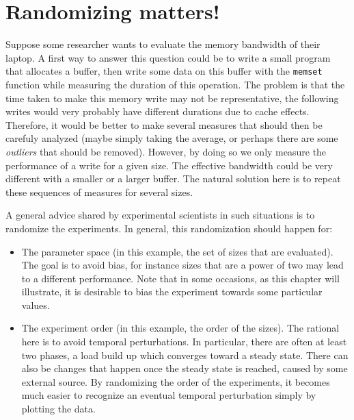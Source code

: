 \chapter{Randomizing matters!}%
\label{chapter:experiment:randomizing}
    Suppose some researcher wants to evaluate the memory bandwidth of their laptop. A first way to answer this question
    could be to write a small program that allocates a buffer, then write some data on this buffer with the
    \texttt{memset} function while measuring the duration of this operation. The problem is that the time taken to make
    this memory write may not be representative, the following writes would very probably have different durations due
    to cache effects.  Therefore, it would be better to make several measures that should then be carefuly analyzed
    (maybe simply taking the average, or perhaps there are some \emph{outliers} that should be removed). However, by
    doing so we only measure the performance of a write for a given size. The effective bandwidth could be very
    different with a smaller or a larger buffer. The natural solution here is to repeat these sequences of measures for
    several sizes.

    A general advice shared by experimental scientists in such situations is to randomize the experiments. In general,
    this randomization should happen for:
    \begin{itemize}
        \item The parameter space (in this example, the set of sizes that are evaluated). The goal is to avoid bias, for
            instance sizes that are a power of two may lead to a different performance. Note that in some occasions, as
            this chapter will illustrate, it is desirable to bias the experiment towards some particular values.
        \item The experiment order (in this example, the order of the sizes). The rational here is to avoid temporal
            perturbations. In particular, there are often at least two phases, a load build up which converges toward a
            steady state. There can also be changes that happen once the steady state is reached, \eg caused by some
            external source. By randomizing the order of the experiments, it becomes much easier to recognize an
            eventual temporal perturbation simply by plotting the data.
    \end{itemize}

